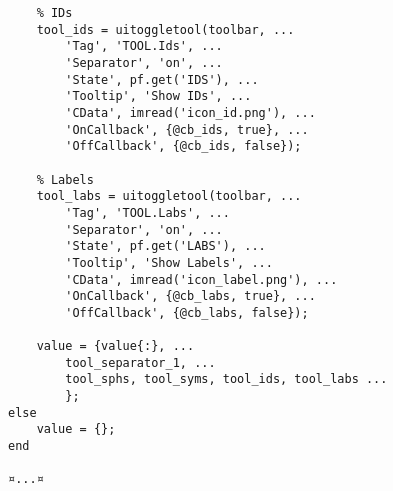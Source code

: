 \documentclass{tufte-handout}
\begin{document}
\begin{lstlisting}
    % IDs
    tool_ids = uitoggletool(toolbar, ...
        'Tag', 'TOOL.Ids', ...
        'Separator', 'on', ...
        'State', pf.get('IDS'), ...
        'Tooltip', 'Show IDs', ...
        'CData', imread('icon_id.png'), ...
        'OnCallback', {@cb_ids, true}, ...
        'OffCallback', {@cb_ids, false});

    % Labels
    tool_labs = uitoggletool(toolbar, ...
        'Tag', 'TOOL.Labs', ...
        'Separator', 'on', ...
        'State', pf.get('LABS'), ...
        'Tooltip', 'Show Labels', ...
        'CData', imread('icon_label.png'), ...
        'OnCallback', {@cb_labs, true}, ...
        'OffCallback', {@cb_labs, false});
    
    value = {value{:}, ...
        tool_separator_1, ...
        tool_sphs, tool_syms, tool_ids, tool_labs ...
        };
else
	value = {};
end

¤...¤
\end{lstlisting}
\end{document}
